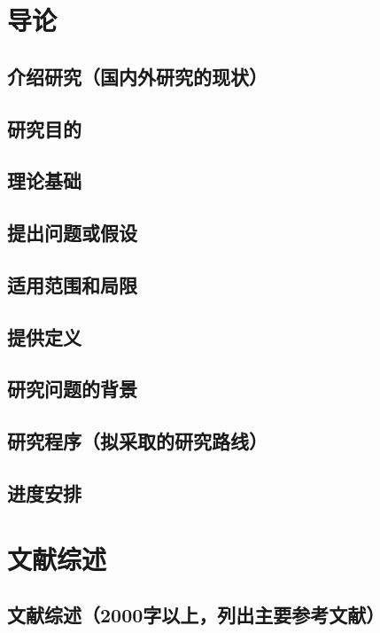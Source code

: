 \chapter{导论}\label{chap:introduction}

\section{介绍研究（国内外研究的现状）}

\section{研究目的}

\section{理论基础}

\section{提出问题或假设}

\section{适用范围和局限}

\section{提供定义}

\section{研究问题的背景}

\section{研究程序（拟采取的研究路线）}

\section{进度安排}

\chapter{文献综述}
\section{文献综述（2000字以上，列出主要参考文献）}

